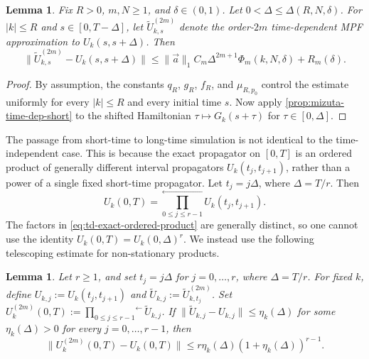 \documentclass[10pt,reqno]{article}
\numberwithin{equation}{section}
\theoremstyle{plain}
\newtheorem{lem}[thm]{Lemma}
\theoremstyle{definition}
\begin{document}
\begin{lem}\label{lem:td-pointwise-short-time-step}
Fix \(R>0\), \(m,N\ge1\), and \(\delta\in(0,1)\).  Let
\(0<\Delta\le \Delta(R,N,\delta)\).  For \(|k|\le R\) and
\(s\in[0,T-\Delta]\), let \(\widetilde U_{k,s}^{(2m)}\) denote the order-\(2m\)
time-dependent MPF approximation to \(U_k(s,s+\Delta)\).  Then
\begin{equation}\label{eq:td-pointwise-short-time-step}
\| \widetilde U_{k,s}^{(2m)}-U_k(s,s+\Delta) \| \le \|\vec a\|_1 C_m\Delta^{2m+1}\Phi_m(k,N,\delta) + R_m(\delta).
\end{equation}
\end{lem}

\begin{proof}
By assumption, the constants \(q_R\), \(g_R\), \(f_R\), and \(\mu_{R,p_0}\) control the estimate uniformly for every \(|k|\le R\) and every initial time \(s\).  Now apply \cref{prop:mizuta-time-dep-short} to the shifted Hamiltonian $\tau\mapsto G_k(s+\tau)$ for $\tau\in[0,\Delta]$.  
\end{proof}

The passage from short-time to long-time simulation is not identical to the time-independent case. This is because the exact propagator on \([0,T]\) is an ordered product of generally different interval propagators \(U_k(t_j,t_{j+1})\), rather than a power of a single fixed short-time propagator. Let \(t_j=j\Delta\), where \(\Delta=T/r\).  Then
\begin{equation}\label{eq:td-exact-ordered-product}
U_k(0,T)=\overset{\longleftarrow}{\prod_{0 \leq j \leq r-1}} U_k(t_j,t_{j+1}).
\end{equation}
The factors in \cref{eq:td-exact-ordered-product} are generally distinct, so one cannot use the
identity \(U_k(0,T)=U_k(0,\Delta)^r\).  We instead use the following telescoping estimate for
non-stationary products.

\begin{lem}\label{lem:td-nonstationary-telescoping}
Let \(r \ge 1\), and set \(t_j = j\Delta\) for \(j=0,\ldots,r\), where \(\Delta = T/r\). For fixed \(k\), define $U_{k,j}:=U_k(t_j,t_{j+1})$ and $\widetilde U_{k,j}:=\widetilde U_{k,t_j}^{(2m)}$. Set $U_k^{(2m)}(0,T) := \overset{\longleftarrow}{\prod_{0 \leq j \leq r-1}} \widetilde U_{k,j}$. If $\|\widetilde U_{k,j}-U_{k,j}\|\le \eta_k(\Delta)$ for some $\eta_k(\Delta) > 0$
for every \(j=0,\ldots,r-1\), then
\begin{equation}\label{eq:td-nonstationary-telescoping-bound}
\| U_k^{(2m)}(0,T)-U_k(0,T) \| \le r\eta_k(\Delta)\left(1+\eta_k(\Delta)\right)^{r-1}.
\end{equation}
\end{lem}
\end{document}
